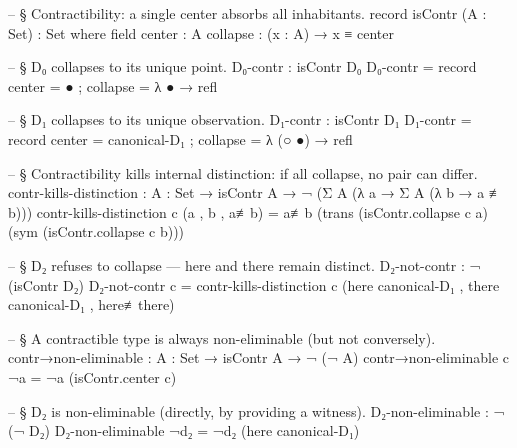 \documentclass[11pt,a4paper]{book}
\begin{document}
\begin{center}
\end{center}

\begin{code}

-- § Contractibility: a single center absorbs all inhabitants.
record isContr (A : Set) : Set where
  field
    center : A
    collapse : (x : A) → x ≡ center

-- § D₀ collapses to its unique point.
D₀-contr : isContr D₀
D₀-contr = record { center = ● ; collapse = λ { ● → refl } }

-- § D₁ collapses to its unique observation.
D₁-contr : isContr D₁
D₁-contr = record { center = canonical-D₁ ; collapse = λ { (○ ●) → refl } }

-- § Contractibility kills internal distinction: if all collapse, no pair can differ.
contr-kills-distinction : {A : Set} → isContr A
                        → ¬ (Σ A (λ a → Σ A (λ b → a ≢ b)))
contr-kills-distinction c (a , b , a≢b) =
  a≢b (trans (isContr.collapse c a) (sym (isContr.collapse c b)))

-- § D₂ refuses to collapse — here and there remain distinct.
D₂-not-contr : ¬ (isContr D₂)
D₂-not-contr c = contr-kills-distinction c
  (here canonical-D₁ , there canonical-D₁ , here≢there)

-- § A contractible type is always non-eliminable (but not conversely).
contr→non-eliminable : {A : Set} → isContr A → ¬ (¬ A)
contr→non-eliminable c ¬a = ¬a (isContr.center c)

-- § D₂ is non-eliminable (directly, by providing a witness).
D₂-non-eliminable : ¬ (¬ D₂)
D₂-non-eliminable ¬d₂ = ¬d₂ (here canonical-D₁)

\end{code}
\end{document}
